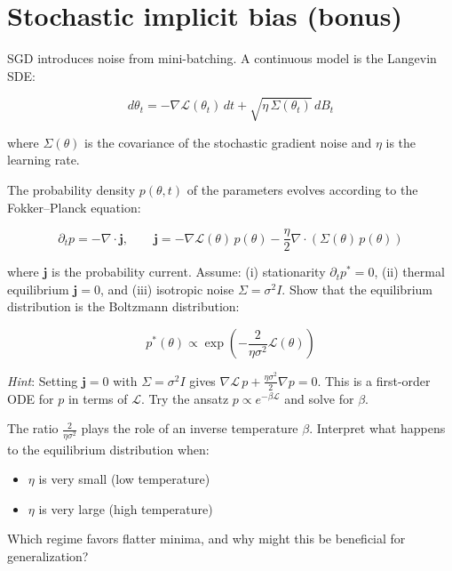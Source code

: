 \documentclass[11pt]{article}
\providecommand{\tightlist}{%
  \setlength{\itemsep}{0pt}\setlength{\parskip}{0pt}}
\begin{document}
\section{Stochastic implicit bias (bonus)}
\label{sec:td-stochastic}

SGD introduces noise from mini-batching. A continuous model is the Langevin SDE:

\[d\theta_t = -\nabla \mathcal{L}(\theta_t)\,dt + \sqrt{\eta\,\Sigma(\theta_t)}\,dB_t\]

where \(\Sigma(\theta)\) is the covariance of the stochastic gradient
noise and \(\eta\) is the learning rate.

\begin{exercise}
\label{ex:td-6a}
The probability density \(p(\theta, t)\) of the parameters
evolves according to the Fokker--Planck equation:

\[\partial_t p = -\nabla \cdot \mathbf{j}, \qquad \mathbf{j} = -\nabla \mathcal{L}(\theta)\,p(\theta) - \frac{\eta}{2}\nabla \cdot \left(\Sigma(\theta)\,p(\theta)\right)\]

where \(\mathbf{j}\) is the probability current. Assume: (i)
stationarity \(\partial_t p^* = 0\), (ii) thermal equilibrium
\(\mathbf{j} = 0\), and (iii) isotropic noise \(\Sigma = \sigma^2 I\).
Show that the equilibrium distribution is the Boltzmann distribution:

\[p^*(\theta) \propto \exp\left(-\frac{2}{\eta \sigma^2}\mathcal{L}(\theta)\right)\]

\emph{Hint}: Setting \(\mathbf{j} = 0\) with \(\Sigma = \sigma^2 I\)
gives \(\nabla \mathcal{L}\, p + \frac{\eta\sigma^2}{2}\nabla p = 0\).
This is a first-order ODE for \(p\) in terms of \(\mathcal{L}\). Try the
ansatz \(p \propto e^{-\beta \mathcal{L}}\) and solve for \(\beta\).
\end{exercise}


\begin{exercise}
\label{ex:td-6b}
The ratio \(\frac{2}{\eta \sigma^2}\) plays the role of an
inverse temperature \(\beta\). Interpret what happens to the equilibrium
distribution when:

\begin{itemize}
\tightlist
\item
  \(\eta\) is very small (low temperature)
\item
  \(\eta\) is very large (high temperature)
\end{itemize}

Which regime favors flatter minima, and why might this be beneficial for
generalization?
\end{exercise}
\end{document}
